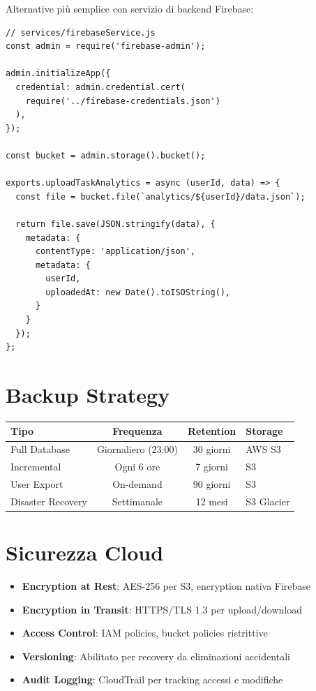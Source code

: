 \documentclass[12pt,a4paper]{report}
\begin{document}
Alternative più semplice con servizio di backend Firebase:

\begin{lstlisting}
// services/firebaseService.js
const admin = require('firebase-admin');

admin.initializeApp({
  credential: admin.credential.cert(
    require('../firebase-credentials.json')
  ),
});

const bucket = admin.storage().bucket();

exports.uploadTaskAnalytics = async (userId, data) => {
  const file = bucket.file(`analytics/${userId}/data.json`);
  
  return file.save(JSON.stringify(data), {
    metadata: {
      contentType: 'application/json',
      metadata: {
        userId,
        uploadedAt: new Date().toISOString(),
      }
    }
  });
};
\end{lstlisting}

\section{Backup Strategy}

\begin{table}[H]
    \centering
    \begin{tabular}{|l|c|c|p{5cm}|}
        \hline
        \textbf{Tipo} & \textbf{Frequenza} & \textbf{Retention} & \textbf{Storage} \\
        \hline
        Full Database & Giornaliero (23:00) & 30 giorni & AWS S3 \\
        \hline
        Incremental & Ogni 6 ore & 7 giorni & S3 \\
        \hline
        User Export & On-demand & 90 giorni & S3 \\
        \hline
        Disaster Recovery & Settimanale & 12 mesi & S3 Glacier \\
        \hline
    \end{tabular}
\end{table}

\section{Sicurezza Cloud}

\begin{itemize}
    \item \textbf{Encryption at Rest}: AES-256 per S3, encryption nativa Firebase
    \item \textbf{Encryption in Transit}: HTTPS/TLS 1.3 per upload/download
    \item \textbf{Access Control}: IAM policies, bucket policies ristrittive
    \item \textbf{Versioning}: Abilitato per recovery da eliminazioni accidentali
    \item \textbf{Audit Logging}: CloudTrail per tracking accessi e modifiche
\end{itemize}
\end{document}
